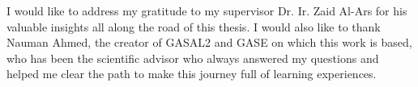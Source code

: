 


\vskip 1cm

I would like to address my gratitude to my supervisor Dr. Ir. Zaid Al-Ars for his valuable insights all along the road of this thesis. I would also like to thank Nauman Ahmed, the creator of GASAL2 and GASE on which this work is based, who has been the scientific advisor who always answered my questions and helped me clear the path to make this journey full of learning experiences.



\vskip 2cm
\noindent \AUTHOR \\
\PLACE \\
\DATE